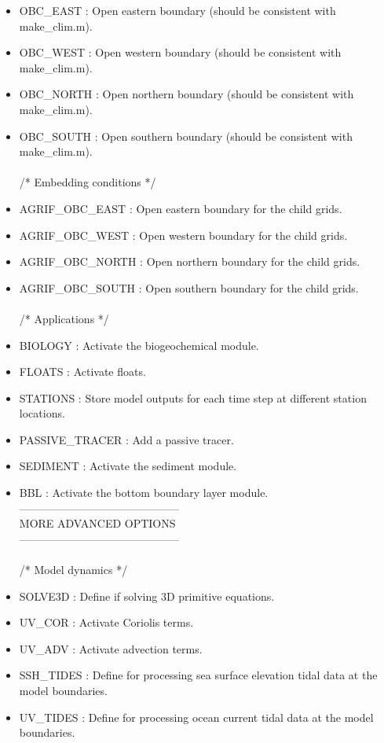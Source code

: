 \begin{itemize}
\item OBC\_EAST : Open eastern boundary (should be consistent with make\_clim.m).
\item OBC\_WEST : Open western boundary (should be consistent with make\_clim.m).
\item OBC\_NORTH : Open northern boundary (should be consistent with make\_clim.m).
\item OBC\_SOUTH : Open southern boundary (should be consistent with make\_clim.m).
\\ \\ /*                       Embedding conditions */
\item AGRIF\_OBC\_EAST  : Open eastern boundary for the child grids.
\item AGRIF\_OBC\_WEST   : Open western boundary for the child grids.
\item AGRIF\_OBC\_NORTH   : Open northern boundary for the child grids.
\item AGRIF\_OBC\_SOUTH   : Open southern boundary for the child grids.
\\ \\ /*                       Applications */
\item BIOLOGY : Activate the biogeochemical module. 
\item FLOATS : Activate floats.
\item STATIONS : Store model outputs for each time step at different station locations.
\item PASSIVE\_TRACER : Add a passive tracer.
\item SEDIMENT : Activate the sediment module.
\item BBL : Activate the bottom boundary layer module.
\\
--------------------------------------------\\
   MORE ADVANCED OPTIONS \\
--------------------------------------------
\\ \\ /*                       Model dynamics */
\item SOLVE3D : Define if solving 3D primitive equations.
\item UV\_COR : Activate Coriolis terms.
\item UV\_ADV : Activate advection terms.
\item SSH\_TIDES : Define for processing sea surface elevation tidal data at the model boundaries.
\item UV\_TIDES :  Define for processing ocean current tidal data at the model boundaries.

\end{itemize}
